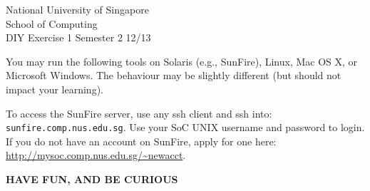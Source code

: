 \documentclass[a4paper,11pt]{exam}
\begin{document}
\extraheadheight{.5in}
%
{\large\sf National University of Singapore\\ School of Computing \\
\LARGE\sf DIY Exercise 1}%
{\large\sf Semester 2 12/13}
\firstpageheadrule
\pagestyle{headandfoot}

You may run the following tools on Solaris (e.g., SunFire), Linux, Mac OS X, or Microsoft Windows.  The behaviour may be slightly different (but should not impact your learning).

To access the SunFire server, use any ssh client and ssh into:
\texttt{sunfire.comp.nus.edu.sg}.   Use your SoC UNIX username and password to login.  If you do not have an account on SunFire, apply for one here: \url{http://mysoc.comp.nus.edu.sg/~newacct}.

\begin{center}
	\textbf\textsf{HAVE FUN, AND BE CURIOUS}
\end{center}
\end{document}
